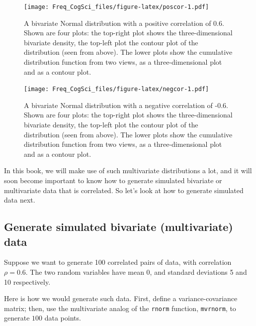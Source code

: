 \documentclass[12pt,]{krantz}
\begin{document}
\begin{figure}
\centering
\texttt{[image: Freq\_CogSci\_files/figure-latex/poscor-1.pdf]}
\caption{\label{fig:poscor}A bivariate Normal distribution with a positive correlation of 0.6. Shown are four plots: the top-right plot shows the three-dimensional bivariate density, the top-left plot the contour plot of the distribution (seen from above). The lower plots show the cumulative distribution function from two views, as a three-dimensional plot and as a contour plot.}
\end{figure}

\begin{figure}
\centering
\texttt{[image: Freq\_CogSci\_files/figure-latex/negcor-1.pdf]}
\caption{\label{fig:negcor}A bivariate Normal distribution with a negative correlation of -0.6. Shown are four plots: the top-right plot shows the three-dimensional bivariate density, the top-left plot the contour plot of the distribution (seen from above). The lower plots show the cumulative distribution function from two views, as a three-dimensional plot and as a contour plot.}
\end{figure}

In this book, we will make use of such multivariate distributions a lot, and it will soon become important to know how to generate simulated bivariate or multivariate data that is correlated. So let's look at how to generate simulated data next.

\hypertarget{generate-simulated-bivariate-multivariate-data}{%
\subsection{Generate simulated bivariate (multivariate) data}\label{generate-simulated-bivariate-multivariate-data}}

Suppose we want to generate 100 correlated pairs of data, with correlation \(\rho=0.6\). The two random variables have mean 0, and standard deviations 5 and 10 respectively.

Here is how we would generate such data. First, define a variance-covariance matrix; then, use the multivariate analog of the \texttt{rnorm} function, \texttt{mvrnorm}, to generate \(100\) data points.
\end{document}
